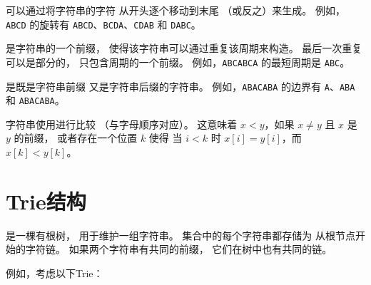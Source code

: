 
可以通过将字符串的字符
从开头逐个移动到末尾
（或反之）来生成。
例如，\texttt{ABCD} 的旋转有
\texttt{ABCD}、\texttt{BCDA}、\texttt{CDAB} 和 \texttt{DABC}。


是字符串的一个前缀，
使得该字符串可以通过重复该周期来构造。
最后一次重复可以是部分的，
只包含周期的一个前缀。
例如，\texttt{ABCABCA} 的最短周期是
\texttt{ABC}。


是既是字符串前缀
又是字符串后缀的字符串。
例如，\texttt{ABACABA} 的边界有
\texttt{A}、\texttt{ABA} 和 \texttt{ABACABA}。


字符串使用进行比较
（与字母顺序对应）。
这意味着 $x<y$，如果 $x \neq y$ 且 $x$ 是 $y$ 的前缀，
或者存在一个位置 $k$ 使得
当 $i<k$ 时 $x[i]=y[i]$，而 $x[k]<y[k]$。

\section{Trie结构}


是一棵有根树，
用于维护一组字符串。
集合中的每个字符串都存储为
从根节点开始的字符链。
如果两个字符串有共同的前缀，
它们在树中也有共同的链。

例如，考虑以下Trie：

